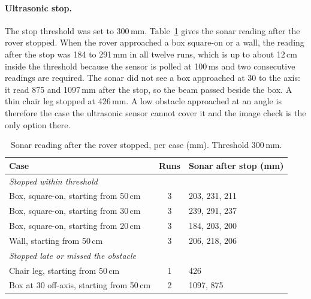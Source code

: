 \paragraph{Ultrasonic stop.} The stop threshold was set to 300\,mm. Table~\ref{tab:sonar} 
gives the sonar reading after the rover stopped. When the rover approached a box square-on or a wall, 
the reading after the stop was 184 to 291\,mm in all twelve runs, which is up to about 12\,cm inside 
the threshold because the sensor is polled at 100\,ms and two consecutive readings are required. 
The sonar did not see a box approached at 30\textdegree{} to the axis: it read 875 and 1097\,mm after 
the stop, so the beam passed beside the box. A thin chair leg stopped at 426\,mm. A low obstacle approached at 
an angle is therefore the case the ultrasonic sensor cannot cover it and the image check is the only option there.

\begin{table}[htbp]
    \centering
    \caption{Sonar reading after the rover stopped, per case (mm). Threshold 300\,mm.}
    \label{tab:sonar}
    \begin{tabular}{lcl}
        \toprule
        Case & Runs & Sonar after stop (mm) \\
        \midrule
        \multicolumn{3}{l}{\textit{Stopped within threshold}} \\
        \addlinespace[2pt]
        Box, square-on, starting from 50\,cm & 3 & 203, 231, 211 \\
        Box, square-on, starting from 30\,cm & 3 & 239, 291, 237 \\
        Box, square-on, starting from 20\,cm & 3 & 184, 203, 200 \\
        Wall, starting from 50\,cm           & 3 & 206, 218, 206 \\
        \midrule
        \multicolumn{3}{l}{\textit{Stopped late or missed the obstacle}} \\
        \addlinespace[2pt]
        Chair leg, starting from 50\,cm                     & 1 & 426 \\
        Box at 30\textdegree{} off-axis, starting from 50\,cm & 2 & 1097, 875 \\
        \bottomrule
    \end{tabular}
\end{table}



